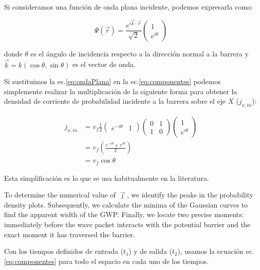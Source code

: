 Si consideramos una función de onda plana incidente, podemos expresarla como:

\begin{equation}
    \label{eq:ondaPlana}
    \Psi(\vec{r})=\frac{e^{i\vec{k}\cdot\vec{r}}}{\sqrt{2}}
    \begin{pmatrix}
        1 \\ e^{i\theta}
    \end{pmatrix}
\end{equation}

\noindent donde $\theta$ es el ángulo de incidencia respecto a la dirección normal a la barrera y $\vec{k} = k(\cos\theta,\sin\theta)$ es el vector de onda.

Si sustituimos la ec.\eqref{eq:ondaPlana} en la ec.\eqref{eq:componentes} podemos simplemente realizar la multiplicación de la siguiente forma para obtener la densidad de corriente de probabilidad incidente a la barrera sobre el eje $X$ ($j_{x,in}$):

\begin{align}
    \label{eq:jdemostrada}
    j_{x, in}&=v_f\frac{1}{2}
    \begin{pmatrix}
        e^{-i\theta} & 1
    \end{pmatrix}
    \begin{pmatrix}
        0 & 1 \\
        1 & 0
    \end{pmatrix}
    \begin{pmatrix}
        1 \\ e^{i\theta}
    \end{pmatrix}\nonumber \\
    &=v_f\left( \frac{e^{-i\theta} + e^{i\theta}}{2} \right)\nonumber \\
    &=v_f\cos\theta
\end{align}

Esta simplificación es lo que se usa habitualmente en la literatura\cite{DahalJPhysChemSolids2017, WuJAP2009}.

To determine the numerical value of $\vec{\jmath}$, we identify the peaks in the probability density plots.
Subsequently, we calculate the minima of the Gaussian curves to find the apparent width of the GWP. Finally, we locate two precise moments: immediately before the wave packet interacts with the potential barrier and the exact moment it has traversed the barrier.

Con los tiempos definidos de entrada ($t_1$) y de salida ($t_2$), usamos la ecuación ec.\eqref{eq:componentes} para todo el espacio en cada uno de los tiempos.

